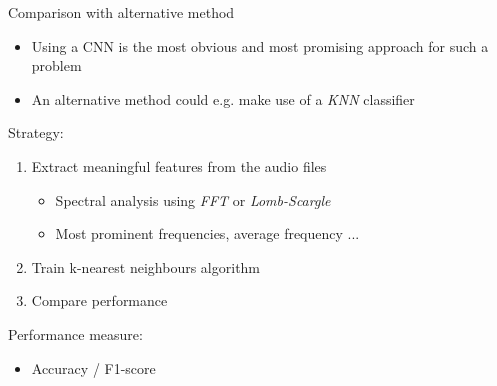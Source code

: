 \begin{frame}{Comparison with alternative method}
  \begin{itemize}
    \item Using a CNN is the most obvious and most promising approach for such a problem 
    \item An alternative method could e.g. make use of a \textit{KNN} classifier
  \end{itemize}
  \vspace{2mm}
  \textcolor{tugreen}{\large Strategy:}
  \begin{enumerate}
    \item Extract meaningful features from the audio files 
    \begin{itemize}
      \item Spectral analysis using \textit{FFT} or \textit{Lomb-Scargle}
      \item Most prominent frequencies, average frequency ... 
    \end{itemize}
    \item Train k-nearest neighbours algorithm 
    \item Compare performance
  \end{enumerate}
  \vspace{2mm}
  \textcolor{tugreen}{\large Performance measure:}
  \begin{itemize}
    \item Accuracy / F1-score
  \end{itemize}
\end{frame}

